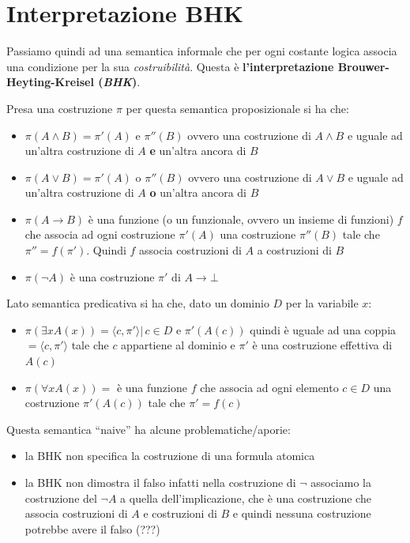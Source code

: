 \documentclass[a4paper,12pt, oneside]{book}
\begin{document}
\section{Interpretazione BHK}
Passiamo quindi ad una semantica informale che per ogni costante logica associa
una condizione per la sua \textit{costruibilità}. Questa è
\textbf{l'interpretazione Brouwer-Heyting-Kreisel (\textit{BHK})}.
\begin{definizione}
  Presa una costruzione $\pi$ per questa semantica proposizionale si ha che:
  \begin{itemize}
    \item $\pi(A\land B)=\pi'(A)\mbox{ e } \pi''(B)$ ovvero una costruzione di
    $A\land B$ e uguale ad un'altra costruzione di $A$ \textbf{e} un'altra
    ancora di $B$ 
    \item $\pi(A\lor B)=\pi'(A)\mbox{ o } \pi''(B)$ ovvero una costruzione di
    $A\lor B$ e uguale ad un'altra costruzione di $A$ \textbf{o} un'altra ancora
    di $B$
    \item $\pi(A\to B)$ è una funzione  (o un funzionale, ovvero un
    insieme di funzioni) $f$ che associa ad ogni
    costruzione $\pi'(A)$ una costruzione $\pi''(B)$ tale che
    $\pi''=f(\pi')$. Quindi $f$ associa costruzioni di $A$ a costruzioni di $B$
    \item $\pi(\neg A)$ è una costruzione $\pi'$ di $A\to\bot$
  \end{itemize}
  Lato semantica predicativa si ha che, dato un dominio $D$ per la variabile
  $x$: 
  \begin{itemize}
    \item $\pi(\exists xA(x))=\langle c,\pi'\rangle|\,c\in D\mbox{ e
    }\pi'(A(c))$ quindi è uguale ad una coppia $=\langle c,\pi'\rangle$ tale che
    $c$ appartiene al dominio e $\pi'$ è una costruzione effettiva di $A(c)$
    \item $\pi(\forall xA(x))=$ è una funzione $f$ che associa ad ogni elemento
    $c\in D$ una costruzione $\pi'(A(c))$ tale che $\pi'=f(c)$
  \end{itemize}
\end{definizione}
Questa semantica ``naive'' ha alcune problematiche/aporie:
\begin{itemize}
  \item la BHK non specifica la costruzione di una formula atomica
  \item la BHK non dimostra il falso infatti nella costruzione di $\neg$
  associamo la costruzione del $\neg A$ a quella dell'implicazione, che è una
  costruzione che associa costruzioni di $A$ e costruzioni di $B$ e quindi
  nessuna costruzione potrebbe avere il falso (???)
\end{itemize}
\end{document}
